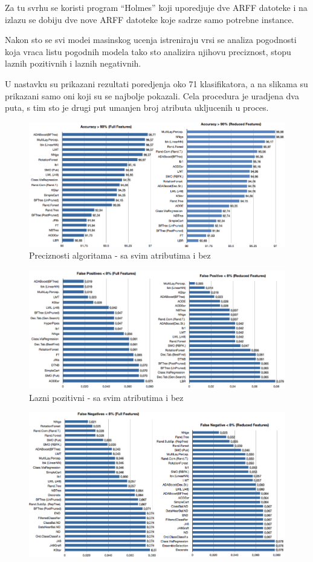 \documentclass[a4paper]{article}
\begin{document}
{Za tu svrhu se koristi program ``Holmes'' koji uporedjuje dve ARFF datoteke i na izlazu se dobiju dve nove ARFF datoteke koje sadrze samo potrebne  instance.

Nakon sto se svi modei masinskog ucenja istreniraju vrsi se analiza pogodnosti
koja vraca listu pogodnih modela tako sto analizira njihovu preciznost, stopu laznih pozitivnih i laznih negativnih.

U nastavku su prikazani rezultati poredjenja oko 71 klasifikatora, a na slikama su prikazani samo oni koji su se najbolje pokazali. Cela procedura je uradjena dva puta, s tim sto je drugi put umanjen broj atributa ukljucenih u proces.


\begin{figure}[h!]
\centering
\includegraphics[width=\textwidth]{accuracy.png}
\caption{Preciznosti algoritama - sa svim atributima i bez}
\label{fig:acc}
\end{figure}
\begin{figure}[h!]
\centering
\includegraphics[width=\textwidth]{false_positive.png}
\caption{Lazni pozitivni - sa svim atributima i bez}
\label{fig:falsePos}
\end{figure}
\begin{figure}[h!]
\centering
\includegraphics[width=\textwidth]{false_negative.png}

\end{figure}}
\end{document}
